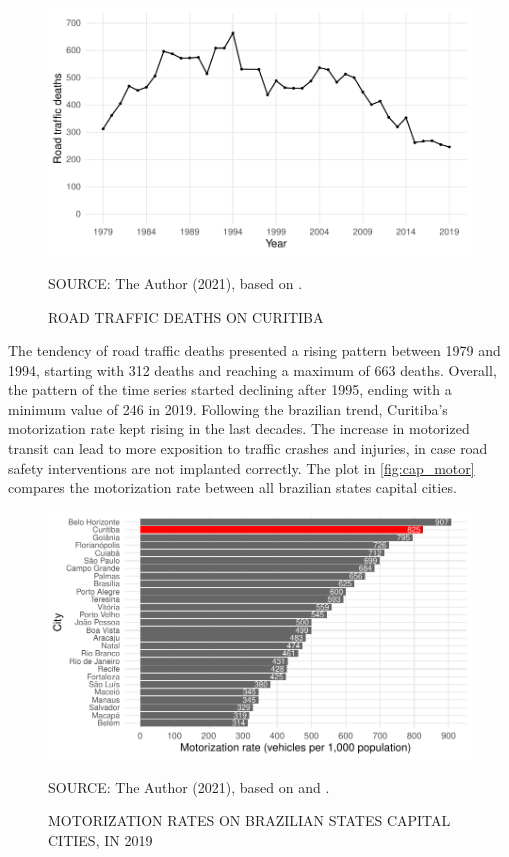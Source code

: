 \begin{figure}[!htbp]
    \centering\footnotesize
    \captionsetup{font=footnotesize}
    \caption{ROAD TRAFFIC DEATHS ON CURITIBA}
    \includegraphics{fig/cwb_abs.pdf}
    \label{fig:cwb_abs}
    \par SOURCE: The Author (2021), based on \textcite{MinistryofHealth2020}.
\end{figure}  

The tendency of road traffic deaths presented a rising pattern between 1979 and 1994, starting with 312 deaths and reaching a maximum of 663 deaths. Overall, the pattern of the time series started declining after 1995, ending with a minimum value of 246 in 2019. Following the brazilian trend, Curitiba's motorization rate kept rising in the last decades. The increase in motorized transit can lead to more exposition to traffic crashes and injuries, in case road safety interventions are not implanted correctly. The plot in \autoref{fig:cap_motor} compares the motorization rate between all brazilian states capital cities.    

\begin{figure}[!htbp]
    \centering\footnotesize
    \captionsetup{font=footnotesize}
    \caption{MOTORIZATION RATES ON BRAZILIAN STATES CAPITAL CITIES, IN 2019}
    \includegraphics{fig/cap_motor.pdf}
    \label{fig:cap_motor}
    \par SOURCE: The Author (2021), based on \textcite{MinistryofHealth2021} and \textcite{DENATRAN2020}.
\end{figure}   

